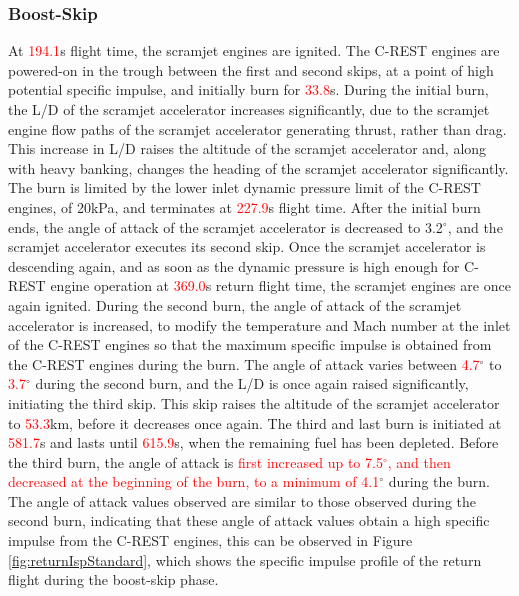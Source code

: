 \subsubsection{ Boost-Skip}\label{sec:boost}
At \textcolor{red}{194.1}s flight time, the scramjet engines are ignited. The C-REST engines are powered-on in the trough between the first and second skips, at a point of high potential specific impulse, and initially burn for \textcolor{red}{33.8}s. During the initial burn, the L/D of the scramjet accelerator increases significantly, due to the scramjet engine flow paths of the scramjet accelerator generating thrust, rather than drag. 
This increase in L/D raises the altitude of the scramjet accelerator and, along with heavy banking, changes the heading of the scramjet accelerator significantly. 
The burn is limited by the lower inlet dynamic pressure limit of the C-REST engines, of 20kPa, and terminates at \textcolor{red}{227.9}s flight time. After the initial burn ends, the angle of attack of the scramjet accelerator is decreased to 3.2$^\circ$, and the scramjet accelerator executes its second skip. Once the scramjet accelerator is descending again, and as soon as the dynamic pressure is high enough for C-REST engine operation at \textcolor{red}{369.0}s return flight time, the scramjet engines are once again ignited.
During the second burn, the angle of attack of the scramjet accelerator is increased, to modify the temperature and Mach number at the inlet of the C-REST engines so that the maximum specific impulse is obtained from the C-REST engines during the burn. 
The angle of attack varies between \textcolor{red}{4.7}$^\circ$ to \textcolor{red}{3.7}$^\circ$ during the second burn, and the L/D is once again raised significantly, initiating the third skip. 
This skip raises the altitude of the scramjet accelerator to \textcolor{red}{53.3}km, before it decreases once again. 
The third and last burn is initiated at \textcolor{red}{581.7}s and lasts until \textcolor{red}{615.9}s, when the remaining fuel has been depleted. Before the third burn, the angle of attack is \textcolor{red}{first increased up to 7.5$^\circ$, and then decreased at the beginning of the burn, to a minimum of 4.1}$^\circ$ during the burn. The angle of attack values observed are similar to those observed during the second burn, indicating that these angle of attack values obtain a high specific impulse from the C-REST engines, this can be observed in Figure \ref{fig:returnIspStandard}, which shows the specific impulse profile of the return flight during the boost-skip phase. 

